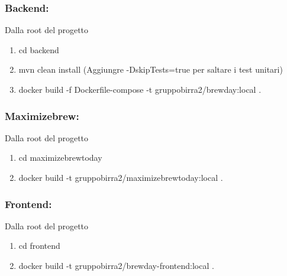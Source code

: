 \documentclass{article}
\begin{document}
\subsubsection{Backend:}
Dalla root del progetto
\begin{enumerate}
    \item cd backend
    \item mvn clean install (Aggiungre -DskipTests=true per saltare i test unitari)
    \item docker build -f Dockerfile-compose -t gruppobirra2/brewday:local .
\end{enumerate}
\subsubsection{Maximizebrew:}
Dalla root del progetto
\begin{enumerate}
\item cd maximizebrewtoday 
\item docker build -t gruppobirra2/maximizebrewtoday:local .
\end{enumerate}
\subsubsection{Frontend:}
Dalla root del progetto
\begin{enumerate}
\item cd frontend
\item docker build -t gruppobirra2/brewday-frontend:local .
\end{enumerate}
\end{document}
